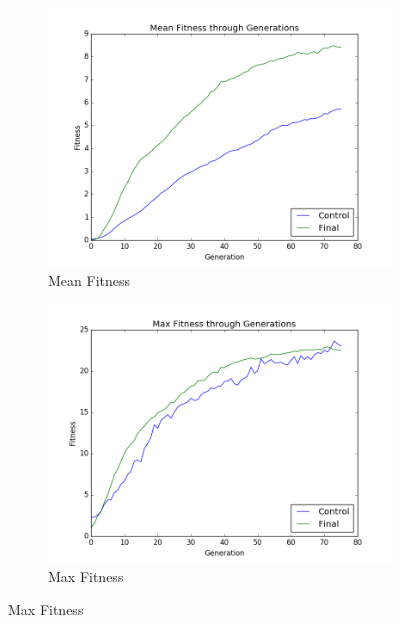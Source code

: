 \documentclass[12pt]{article}
\begin{document}
\begin{figure}[ht]
\centering
\begin{subfigure}{0.5\textwidth}
\centering
\includegraphics[width=1\textwidth]{Figures/result_mean}
\caption{Mean Fitness}
\label{fig:final_mean_fitness}
\end{subfigure}%
\begin{subfigure}{0.5\textwidth}
\centering
\includegraphics[width=1\textwidth]{Figures/result_max}
\caption{Max Fitness}
\label{fig:final_max_fitness}
\end{subfigure}


\end{figure}
\end{document}
